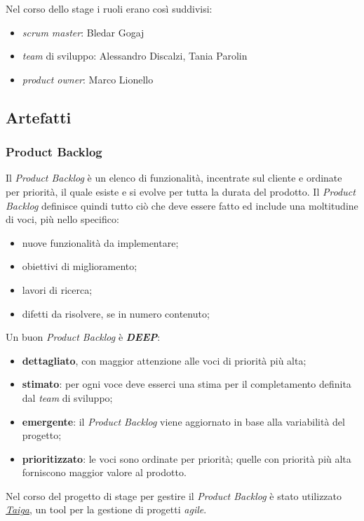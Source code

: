 Nel corso dello stage i ruoli erano così suddivisi:
\begin{itemize}
    \item \textit{scrum master}: Bledar Gogaj
    \item \textit{team} di sviluppo: Alessandro Discalzi, Tania Parolin
    \item \textit{product owner}: Marco Lionello
\end{itemize}

\subsection{Artefatti}

\subsubsection{Product Backlog}
Il \textit{Product Backlog} è un elenco di funzionalità, incentrate sul cliente e ordinate per priorità, il quale esiste e si evolve per tutta la durata del prodotto. Il \textit{Product Backlog} definisce quindi tutto ciò che deve essere fatto ed include una moltitudine di voci, più nello specifico:
\begin{itemize}
    \item nuove funzionalità da implementare;
    \item obiettivi di miglioramento;
    \item lavori di ricerca;
    \item difetti da risolvere, se in numero contenuto;
\end{itemize}
Un buon \textit{Product Backlog} è \textit{\textbf{DEEP}}:
\begin{itemize}
    \item \textbf{dettagliato}, con maggior attenzione alle voci di priorità più alta;
    \item \textbf{stimato}: per ogni voce deve esserci una stima per il completamento definita dal \textit{team} di sviluppo;
    \item \textbf{emergente}: il \textit{Product Backlog} viene aggiornato in base alla variabilità del progetto;
    \item \textbf{prioritizzato}: le voci sono ordinate per priorità; quelle con priorità più alta forniscono maggior valore al prodotto.
\end{itemize}
Nel corso del progetto di stage per gestire il \textit{Product Backlog} è stato utilizzato \textit{\href{https://taiga.io/}{Taiga}}, un tool per la gestione di progetti \textit{agile}.
